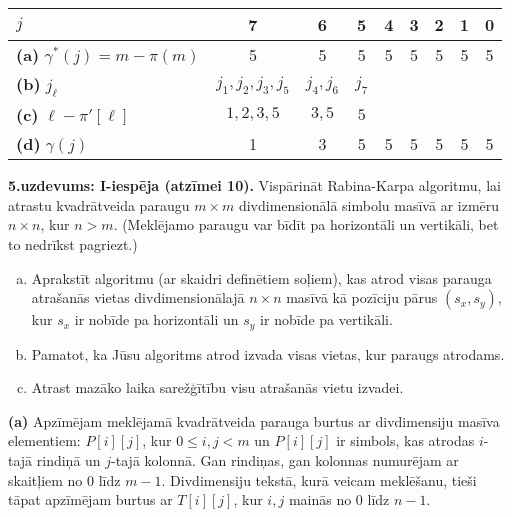 \documentclass[11pt]{article}
\begin{document}
\begin{tabular}{|l||c|c|c|c|c|c|c|c|} \hline
$j$ & 7 & 6 & 5 & 4 & 3 & 2 & 1 & 0 \\ \hline\hline
{\bf (a)} $\gamma^{\ast}(j) = m-\pi(m)$ & 5 & 5 & 5 & 5 & 5 & 5 & 5 & 5 \\ \hline
{\bf (b)} $j_\ell$ & $j_1,j_2,j_3,j_5$ & $j_4,j_6$ & $j_7$ & & & & & \\ \hline
{\bf (c)} $\ell - \pi'[\ell]$ & $1,2,3,5$ & $3,5$ & $5$ & & & & & \\ \hline
{\bf (d)} $\gamma(j)$ & 1 & 3 & 5 & 5 & 5 & 5 & 5 & 5 \\ \hline
\end{tabular}





{\footnotesize
\vspace{10ex}
{\bf 5.uzdevums: I-iespēja (atzīmei 10).}
Vispārināt Rabina-Karpa algoritmu, lai atrastu kvadrātveida paraugu $m \times m$
divdimensionālā simbolu masīvā ar izmēru $n \times n$, kur $n > m$.
(Meklējamo paraugu var bīdīt pa horizontāli un vertikāli, bet to nedrīkst pagriezt.)
\begin{enumerate}[(a)]
\item
Aprakstīt algoritmu (ar skaidri definētiem soļiem),
kas atrod visas parauga atrašanās vietas divdimensionālajā
$n \times n$ masīvā kā pozīciju pārus $(s_x,s_y)$, kur $s_x$ ir nobīde pa horizontāli
un $s_y$ ir nobīde pa vertikāli.
\item
Pamatot, ka Jūsu algoritms atrod izvada visas vietas, kur paraugs atrodams.
\item
Atrast mazāko laika sarežģītību visu atrašanās vietu izvadei.
\end{enumerate}
}

\vspace{2ex}
{\bf (a)} Apzīmējam meklējamā kvadrātveida parauga burtus ar
divdimensiju masīva elementiem: $P[i][j]$, kur $0 \leq i,j < m$ un
$P[i][j]$ ir simbols, kas atrodas $i$-tajā rindiņā un $j$-tajā kolonnā.
Gan rindiņas, gan kolonnas numurējam ar skaitļiem no $0$ līdz $m-1$.
Divdimensiju tekstā, kurā veicam meklēšanu, tieši tāpat apzīmējam
burtus ar $T[i][j]$, kur $i,j$ mainās no $0$ līdz $n-1$.
\end{document}
